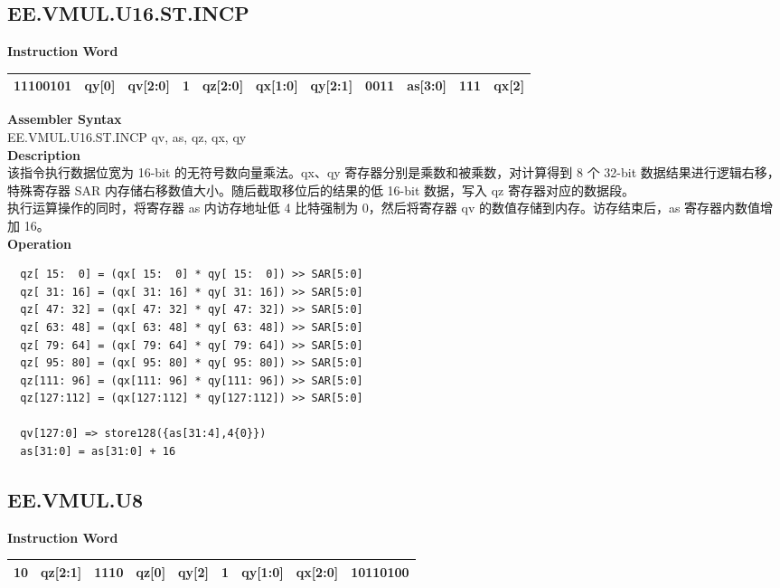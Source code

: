 \clearpage
\subsection{EE.VMUL.U16.ST.INCP}\label{instruction:EEVMULU16STINCP}
\setlength\tabcolsep{6pt}
\textbf{Instruction Word} \\
\begin{tabular}{|c|c|c|c|c|c|c|c|c|c|c|}
	\hline
	11100101 & qy[0] & qv[2:0] & 1 & qz[2:0] & qx[1:0] & qy[2:1] & 0011 & as[3:0] & 111 & qx[2] \\
	\hline
\end{tabular}

\textbf{Assembler Syntax} \\
EE.VMUL.U16.ST.INCP qv, as, qz, qx, qy \\
\textbf{Description} \\
该指令执行数据位宽为 16-bit 的无符号数向量乘法。qx、qy 寄存器分别是乘数和被乘数，对计算得到 8 个 32-bit 数据结果进行逻辑右移，特殊寄存器 SAR 内存储右移数值大小。随后截取移位后的结果的低 16-bit 数据，写入 qz 寄存器对应的数据段。\\ 执行运算操作的同时，将寄存器 as 内访存地址低 4 比特强制为 0，然后将寄存器 qv 的数值存储到内存。访存结束后，as 寄存器内数值增加 16。\\
\textbf{Operation}
\begin{lstlisting}
  qz[ 15:  0] = (qx[ 15:  0] * qy[ 15:  0]) >> SAR[5:0]
  qz[ 31: 16] = (qx[ 31: 16] * qy[ 31: 16]) >> SAR[5:0]
  qz[ 47: 32] = (qx[ 47: 32] * qy[ 47: 32]) >> SAR[5:0]
  qz[ 63: 48] = (qx[ 63: 48] * qy[ 63: 48]) >> SAR[5:0]
  qz[ 79: 64] = (qx[ 79: 64] * qy[ 79: 64]) >> SAR[5:0]
  qz[ 95: 80] = (qx[ 95: 80] * qy[ 95: 80]) >> SAR[5:0]
  qz[111: 96] = (qx[111: 96] * qy[111: 96]) >> SAR[5:0]
  qz[127:112] = (qx[127:112] * qy[127:112]) >> SAR[5:0]

  qv[127:0] => store128({as[31:4],4{0}})
  as[31:0] = as[31:0] + 16
\end{lstlisting}

\clearpage
\subsection{EE.VMUL.U8}\label{instruction:EEVMULU8}
\setlength\tabcolsep{6pt}
\textbf{Instruction Word} \\
\begin{tabular}{|c|c|c|c|c|c|c|c|c|}
	\hline
	10 & qz[2:1] & 1110 & qz[0] & qy[2] & 1 & qy[1:0] & qx[2:0] & 10110100 \\
	\hline
\end{tabular}

